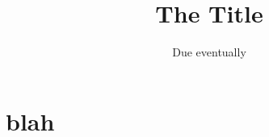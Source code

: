 \documentclass[12pt]{article}
\title{ The Title }
\author{\MyFullName}
\date{ Due eventually }
\begin{document}
\maketitle
\thispagestyle{empty}
\begin{center}
\end{center}
\setcounter{page}{0}
\newpage

\def\thesection{\Roman{section}.}

\section{ blah }
\end{document}
